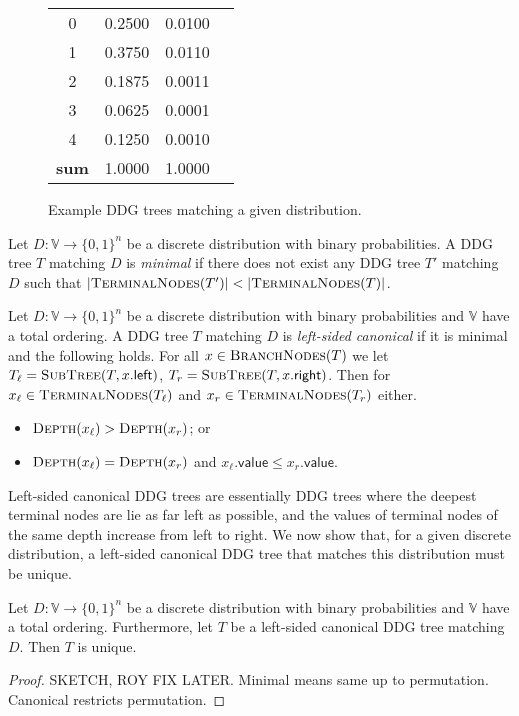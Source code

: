 \begin{figure}
\begin{minipage}{0.3\textwidth}
\begin{tabular}{c l c c}
				0 & 0.2500 & 0.0100 \\
				1 & 0.3750 & 0.0110 \\
				2 & 0.1875 & 0.0011 \\
				3 & 0.0625 & 0.0001 \\
				4 & 0.1250 & 0.0010 \\
				\midrule
				\textbf{sum} & 1.0000 & 1.0000 \\
				\bottomrule
			\end{tabular}
	\end{minipage}
	\caption{Example DDG trees matching a given distribution.}
	\hrulefill
	\label{fig:ddg-tree-examples}
\end{figure}


\begin{definition} \label{def:min-ddg-tree}
Let $D:\mathbb{V} \to \{0, 1\}^n$ be a discrete distribution with binary probabilities. A DDG tree $T$ matching $D$ is \emph{minimal} if there does not exist any DDG tree $T'$ matching $D$ such that $\left| \textsc{TerminalNodes}(T') \right| < \left| \textsc{TerminalNodes}(T) \right|$.
\end{definition}

\begin{definition} \label{def:canon-ddg-tree}
Let $D:\mathbb{V} \to \{0, 1\}^n$ be a discrete distribution with binary probabilities and $\mathbb{V}$ have a total ordering. 
A DDG tree $T$ matching $D$ is \emph{left-sided canonical} if it is minimal and the following holds. 
For all $x \in \textsc{BranchNodes}(T)$ we let $T_\ell = \textsc{SubTree}(T, x.\mathsf{left})$, $T_r = \textsc{SubTree}(T, x.\mathsf{right})$. 
Then for $x_\ell \in \textsc{TerminalNodes}(T_\ell)$ and $x_r \in \textsc{TerminalNodes}(T_r)$ either.
\begin{itemize}
	\item $\textsc{Depth}(x_\ell) > \textsc{Depth}(x_r)$; or
	\item $\textsc{Depth}(x_\ell) = \textsc{Depth}(x_r)$ and $x_\ell.\mathsf{value} \le x_r.\mathsf{value}$.
\end{itemize}
\end{definition}

Left-sided canonical DDG trees are essentially DDG trees where the deepest terminal nodes are lie as far left as possible, and the values of terminal nodes of the same depth increase from left to right.
We now show that, for a given discrete distribution, a left-sided canonical DDG tree that matches this distribution must be unique.

\begin{theorem} \label{thm:uniqueness-of-canon-ddg-trees}
Let $D:\mathbb{V} \to \{0, 1\}^n$ be a discrete distribution with binary probabilities and $\mathbb{V}$ have a total ordering. 
Furthermore, let $T$ be a left-sided canonical DDG tree matching $D$.
Then $T$ is unique.
\end{theorem}

\begin{proof}
SKETCH, ROY FIX LATER. Minimal means same up to permutation. Canonical restricts permutation.
\end{proof}
